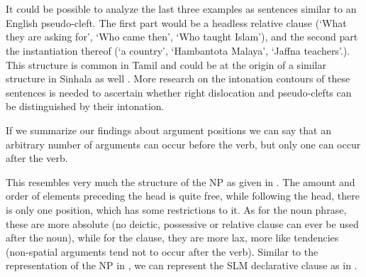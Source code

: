 
 \\
 
 \\

It could be possible to analyze the last three examples as sentences similar to an English pseudo-cleft. The first part would be a headless relative clause (`What they are asking for',  `Who came then',  `Who taught Islam'), and the second part the instantiation thereof (`a country', `Hambantota Malaya', `Jaffna teachers'.). This structure is common in Tamil and could be at the origin of a similar structure in Sinhala as well \citep{Gair1985calque}. More research on the intonation contours of these sentences is needed to ascertain whether right dislocation and pseudo-clefts can be distinguished by their intonation.

If we summarize our findings about argument positions we can say that an arbitrary number of arguments can occur before the verb, but only one can occur after the verb.



This resembles very much the structure of the NP as given in . The amount and order of elements preceding the head is quite free, while following the head, there is only one position, which has some restrictions to it. As for the noun phrase, these are more absolute (no deictic, possessive or relative clause can ever be used after the noun), while for the clause, they are more lax, more like tendencies (non-spatial arguments tend not to occur after the verb). Similar to the representation of the NP  in , we can represent the SLM declarative clause as in .

